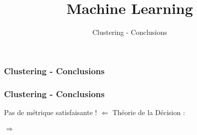 \documentclass{formation}
\title{Machine Learning}
\subtitle{Clustering - Conclusions}
\begin{document}
\begin{frame}
  \frametitle{Clustering - Conclusions}
\end{frame}

\begin{frame}
  \frametitle{Clustering - Conclusions}
  \begin{center}
    Pas de métrique satisfaisante ! $\Leftarrow$ Théorie de la Décision : \\
    $\;$ \\
     \\
    $\Rightarrow$ \\
  \end{center}
\end{frame}
\end{document}
